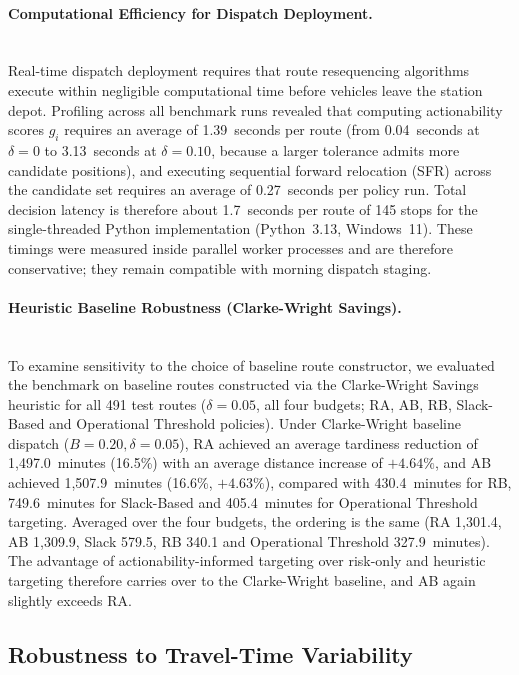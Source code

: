 \documentclass[11pt,a4paper]{article}
\begin{document}
\paragraph{Computational Efficiency for Dispatch Deployment.}\mbox{}\\
Real-time dispatch deployment requires that route resequencing algorithms execute within negligible computational time before vehicles leave the station depot. Profiling across all benchmark runs revealed that computing actionability scores $g_i$ requires an average of 1.39~seconds per route (from 0.04~seconds at $\delta = 0$ to 3.13~seconds at $\delta = 0.10$, because a larger tolerance admits more candidate positions), and executing sequential forward relocation (SFR) across the candidate set requires an average of 0.27~seconds per policy run. Total decision latency is therefore about 1.7~seconds per route of 145 stops for the single-threaded Python implementation (Python~3.13, Windows~11). These timings were measured inside parallel worker processes and are therefore conservative; they remain compatible with morning dispatch staging.

\paragraph{Heuristic Baseline Robustness (Clarke-Wright Savings).}\mbox{}\\
To examine sensitivity to the choice of baseline route constructor, we evaluated the benchmark on baseline routes constructed via the Clarke-Wright Savings heuristic for all 491 test routes ($\delta = 0.05$, all four budgets; RA, AB, RB, Slack-Based and Operational Threshold policies). Under Clarke-Wright baseline dispatch ($B=0.20, \delta=0.05$), RA achieved an average tardiness reduction of 1,497.0~minutes (16.5\%) with an average distance increase of $+4.64\%$, and AB achieved 1,507.9~minutes (16.6\%, $+4.63\%$), compared with 430.4~minutes for RB, 749.6~minutes for Slack-Based and 405.4~minutes for Operational Threshold targeting. Averaged over the four budgets, the ordering is the same (RA 1,301.4, AB 1,309.9, Slack 579.5, RB 340.1 and Operational Threshold 327.9~minutes). The advantage of actionability-informed targeting over risk-only and heuristic targeting therefore carries over to the Clarke-Wright baseline, and AB again slightly exceeds RA.

\subsection{Robustness to Travel-Time Variability}\label{sec:res-scenarios}
\end{document}
